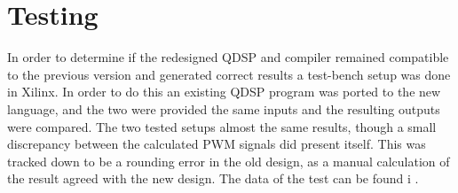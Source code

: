 \chapter{Testing}
\label{sec:testing}
In order to determine if the redesigned QDSP and compiler remained compatible to the previous version and generated correct results a test-bench setup was done in Xilinx. In order to do this an existing QDSP program was ported to the new language, and the two were provided the same inputs and the resulting outputs were compared. The two tested setups almost the same results, though a small discrepancy between the calculated PWM signals did present itself. This was tracked down to be a rounding error in the old design, as a manual calculation of the result agreed with the new design. The data of the test can be found i .